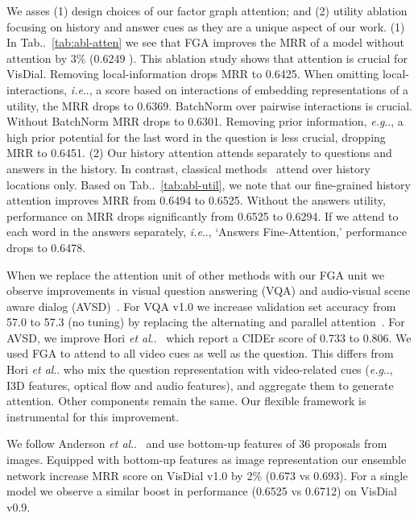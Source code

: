 \documentclass[10pt,twocolumn,letterpaper]{article}
\makeatletter
\def\@onedot{\ifx\@let@token.\else.\null\fi\xspace}
\DeclareRobustCommand\onedot{\futurelet\@let@token\@onedot}
\newcommand{\tabref}[1]{Tab\onedot~\ref{#1}}
\def\eg{\emph{e.g}\onedot} \def\Eg{\emph{E.g}\onedot}
\def\ie{\emph{i.e}\onedot} \def\Ie{\emph{I.e}\onedot}
\def\etal{\emph{et al}\onedot}
\makeatother
\begin{document}
We asses (1) design choices of our factor graph attention; and (2) utility ablation focusing on history and answer cues as they are a unique aspect of our work. 
(1)  In \tabref{tab:abl-atten} we see that FGA improves the MRR of a model without attention by 3\% (0.6249 ). This ablation study shows that attention is crucial for VisDial. Removing local-information drops MRR to 0.6425. When omitting local-interactions, \ie, a score based on interactions of embedding representations of a utility, the MRR drops to 0.6369. BatchNorm over pairwise interactions is crucial. Without BatchNorm MRR drops to 0.6301. Removing prior information, \eg, a high prior potential for the last word in the question is less crucial, dropping MRR to 0.6451. (2)  Our history attention attends separately to questions and answers in the history. In contrast, classical methods~\cite{WuARXIV2016, seo2017visual} attend over history locations only. Based on \tabref{tab:abl-util}, we note that our fine-grained history attention improves MRR from 0.6494 to 0.6525. Without the answers utility, performance on MRR drops significantly from 0.6525 to 0.6294. If we attend to each word in the answers separately, \ie, `Answers Fine-Attention,' performance drops to 0.6478.




  When we replace the attention unit of other methods with our FGA unit we observe improvements in visual question answering (VQA) and audio-visual scene aware dialog (AVSD)~\cite{AnatolICCV2015, alamri2018audio}. For VQA v1.0 we increase validation set accuracy from 57.0 to 57.3 (no tuning) by replacing the alternating and parallel attention~\cite{lu2016hierarchical}. For AVSD, we improve Hori \etal~\cite{hori2018end}  which report a CIDEr score of 0.733 to 0.806. We used FGA to attend to all video cues as well as the question. This differs from Hori \etal who mix the question representation with  video-related cues (\eg, I3D features, optical flow and audio features), and aggregate them to generate attention. Other components remain the same. Our flexible framework is instrumental for this improvement. 


 We follow Anderson \etal~\cite{anderson2018bottom} and use bottom-up features of 36 proposals from images. Equipped with bottom-up features as image representation our ensemble network increase MRR score on VisDial v1.0 by 2\% (0.673 vs 0.693). For a single model we observe a similar boost in performance (0.6525 vs 0.6712) on VisDial v0.9.
\end{document}
